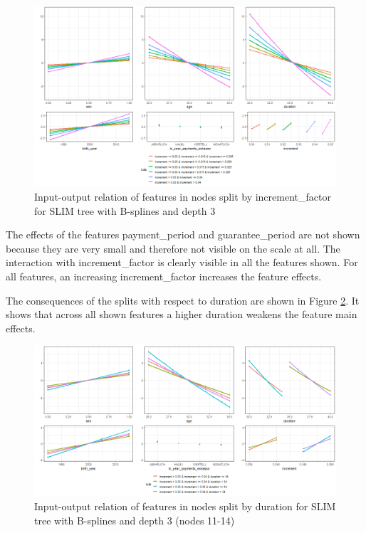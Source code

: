 \begin{figure}[!htb]
    \centering    
    \includegraphics[width=16cm]{Figures/insurance_use_case/k1_08_BPV/effects_increment_factor.png}
    \caption{Input-output relation of features in nodes split by increment\_factor for SLIM tree with B-splines and depth 3}
    \label{fig:ins_k108_effects_increment}
\end{figure}

The effects of the features payment\_period and guarantee\_period are not shown because they are very small and therefore not visible on the scale at all.
The interaction with increment\_factor is clearly visible in all the features shown. For all features, an increasing increment\_factor increases the feature effects.


The consequences of the splits with respect to duration are shown in Figure \ref{fig:ins_k108_effects_duration}. It shows that across all shown features a higher duration weakens the feature main effects.

\begin{figure}[!htb]
    \centering 
    \includegraphics[width=16cm]{Figures/insurance_use_case/k1_08_BPV/effects_duration.png}
    \caption{Input-output relation of features in nodes split by duration for SLIM tree with B-splines and depth 3 (nodes 11-14)}
    \label{fig:ins_k108_effects_duration}
\end{figure}


